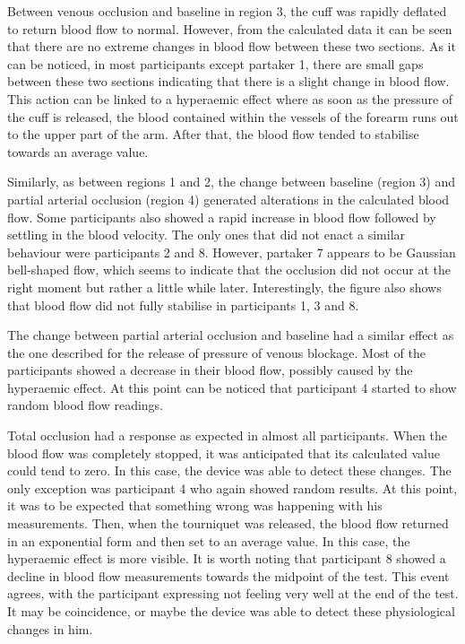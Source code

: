 Between venous occlusion and baseline in region 3, the cuff was rapidly deflated to return blood flow to normal. However, from the calculated data it can be seen that there are no extreme changes in blood flow between these two sections. As it can be noticed, in most participants except partaker 1, there are small gaps between these two sections indicating that there is a slight change in blood flow. This action can be linked to a hyperaemic effect where as soon as the pressure of the cuff is released, the blood contained within the vessels of the forearm runs out to the upper part of the arm. After that, the blood flow tended to stabilise towards an average value. 

Similarly, as between regions 1 and 2, the change between baseline (region 3) and partial arterial occlusion (region 4) generated alterations in the calculated blood flow. Some participants also showed a rapid increase in blood flow followed by settling in the blood velocity. The only ones that did not enact a similar behaviour were participants 2 and 8. However,  partaker 7 appears to be Gaussian bell-shaped flow, which seems to indicate that the occlusion did not occur at the right moment but rather a little while later. Interestingly, the figure also shows that blood flow did not fully stabilise in participants 1, 3 and 8.

The change between partial arterial occlusion and baseline had a similar effect as the one described for the release of pressure of venous blockage. Most of the participants showed a decrease in their blood flow, possibly caused by the hyperaemic effect. At this point can be noticed that participant 4 started to show random blood flow readings. 

Total occlusion had a response as expected in almost all participants. When the blood flow was completely stopped, it was anticipated that its calculated value could tend to zero. In this case, the device was able to detect these changes. The only exception was participant 4 who again showed random results. At this point, it was to be expected that something wrong was happening with his measurements. Then, when the tourniquet was released, the blood flow returned in an exponential form and then set to an average value. In this case, the hyperaemic effect is more visible. It is worth noting that participant 8 showed a decline in blood flow measurements towards the midpoint of the test. This event agrees, with the participant expressing not feeling very well at the end of the test. It may be coincidence, or maybe the device was able to detect these physiological changes in him.

